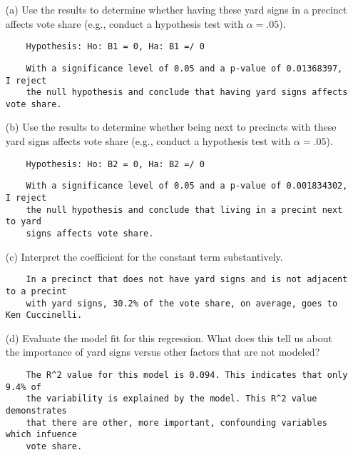 \documentclass[12pt,letterpaper]{article}
\begin{document}
\vspace{.5cm}
\begin{enumerate}
	\item [(a)] Use the results to determine whether having these yard signs in a precinct affects vote share (e.g., conduct a hypothesis test with $\alpha = .05$).
	\begin{verbatim}
	Hypothesis: Ho: B1 = 0, Ha: B1 =/ 0
	\end{verbatim}
	
	\begin{verbatim}
	With a significance level of 0.05 and a p-value of 0.01368397, I reject 
	the null hypothesis and conclude that having yard signs affects vote share. 
	\end{verbatim}
	
	\newpage		
	\item [(b)]  Use the results to determine whether being
	next to precincts with these yard signs affects vote
	share (e.g., conduct a hypothesis test with $\alpha = .05$).
	\begin{verbatim}
	Hypothesis: Ho: B2 = 0, Ha: B2 =/ 0
	\end{verbatim}
	
	\begin{verbatim}
	With a significance level of 0.05 and a p-value of 0.001834302, I reject 
	the null hypothesis and conclude that living in a precint next to yard 
	signs affects vote share. 
	\end{verbatim}
	
	
	\item [(c)] Interpret the coefficient for the constant term substantively.
	\begin{verbatim}
	In a precinct that does not have yard signs and is not adjacent to a precint 
	with yard signs, 30.2% of the vote share, on average, goes to Ken Cuccinelli. 
	\end{verbatim}
	
	\item [(d)] Evaluate the model fit for this regression.  What does this	tell us about the importance of yard signs versus other factors that are not modeled?
	\begin{verbatim}
	The R^2 value for this model is 0.094. This indicates that only 9.4% of 
	the variability is explained by the model. This R^2 value demonstrates 
	that there are other, more important, confounding variables which infuence 
	vote share. 
	\end{verbatim}
	
\end{enumerate}  

\newpage
\end{document}
